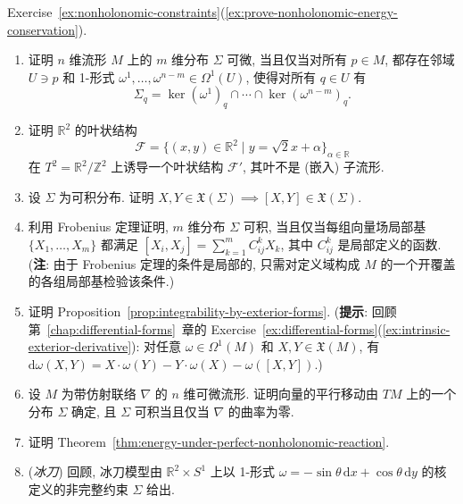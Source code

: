 \begin{RiemannProof}
Exercise~\ref{ex:nonholonomic-constraints}(\ref{ex:prove-nonholonomic-energy-conservation}).
\end{RiemannProof}

\begin{RiemannExercise}\label{ex:nonholonomic-constraints}
\begin{enumerate}[label=(\arabic*),ref=\arabic*,leftmargin=*]
\item\label{ex:distribution-as-common-kernel}
证明 $n$ 维流形 $M$ 上的 $m$ 维分布 $\Sigma$ 可微, 当且仅当对所有 $p\in M$, 都存在邻域 $U\ni p$ 和 1-形式 $\omega^1,\ldots,\omega^{n-m}\in\Omega^1(U)$, 使得对所有 $q\in U$ 有
\[
  \Sigma_q=\ker(\omega^1)_q\cap\cdots\cap\ker(\omega^{n-m})_q.
\]
\item\label{ex:irrational-slope-foliation}
证明 $\mathbb{R}^2$ 的叶状结构
\[
  \mathcal{F}=\bigl\{(x,y)\in\mathbb{R}^2\mid y=\sqrt{2}x+\alpha\bigr\}_{\alpha\in\mathbb{R}}
\]
在 $T^2=\mathbb{R}^2/\mathbb{Z}^2$ 上诱导一个叶状结构 $\mathcal{F}'$, 其叶不是 (嵌入) 子流形.
\item\label{ex:integrability-implies-bracket-closure}
设 $\Sigma$ 为可积分布. 证明 $X,Y\in\mathfrak{X}(\Sigma)\implies[X,Y]\in\mathfrak{X}(\Sigma)$.
\item\label{ex:local-frame-frobenius-criterion}
利用 Frobenius 定理证明, $m$ 维分布 $\Sigma$ 可积, 当且仅当每组向量场局部基 $\{X_1,\ldots,X_m\}$ 都满足 $[X_i,X_j]=\sum_{k=1}^m C_{ij}^kX_k$, 其中 $C_{ij}^k$ 是局部定义的函数. (\textbf{注}: 由于 Frobenius 定理的条件是局部的, 只需对定义域构成 $M$ 的一个开覆盖的各组局部基检验该条件.)
\item\label{ex:prove-exterior-forms-integrability}
证明 Proposition~\ref{prop:integrability-by-exterior-forms}. (\textbf{提示}: 回顾第~\ref{chap:differential-forms}~章的 Exercise~\ref{ex:differential-forms}(\ref{ex:intrinsic-exterior-derivative}): 对任意 $\omega\in\Omega^1(M)$ 和 $X,Y\in\mathfrak{X}(M)$, 有 $\mathrm{d}\omega(X,Y)=X\cdot\omega(Y)-Y\cdot\omega(X)-\omega([X,Y])$.)
\item\label{ex:parallel-transport-integrable-distribution}
设 $M$ 为带仿射联络 $\nabla$ 的 $n$ 维可微流形. 证明向量的平行移动由 $TM$ 上的一个分布 $\Sigma$ 确定, 且 $\Sigma$ 可积当且仅当 $\nabla$ 的曲率为零.
\item\label{ex:prove-nonholonomic-energy-conservation}
证明 Theorem~\ref{thm:energy-under-perfect-nonholonomic-reaction}.
\item\label{ex:ice-skate-dynamics}
(\emph{冰刀}) 回顾, 冰刀模型由 $\mathbb{R}^2\times S^1$ 上以 1-形式 $\omega=-\sin\theta\,\mathrm{d}x+\cos\theta\,\mathrm{d}y$ 的核定义的非完整约束 $\Sigma$ 给出.

\end{enumerate}
\end{RiemannExercise}
